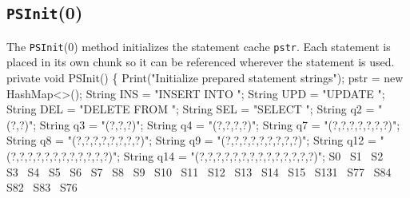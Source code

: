 \documentclass{article}
\theoremstyle{definition}                   %
\begin{document}
\subsection{{\tt{}\protect{}PSInit}(0)}
The {\tt{}\protect{}PSInit}(0) method initializes the statement cache {\tt{}\protect{}pstr}. Each
statement is placed in its own chunk so it can be referenced wherever the
statement is used.
\nwenddocs{}\endmoddef{}
private void PSInit() \{
  Print("Initialize prepared statement strings");
  pstr = new HashMap<>();
  String INS = "INSERT INTO ";
  String UPD = "UPDATE ";
  String DEL = "DELETE FROM ";
  String SEL = "SELECT ";
  String q2  = "(?,?)";
  String q3  = "(?,?,?)";
  String q4  = "(?,?,?,?)";
  String q7  = "(?,?,?,?,?,?,?)";
  String q8  = "(?,?,?,?,?,?,?,?)";
  String q9  = "(?,?,?,?,?,?,?,?,?)";
  String q12 = "(?,?,?,?,?,?,?,?,?,?,?,?)";
  String q14 = "(?,?,?,?,?,?,?,?,?,?,?,?,?,?)";
  \LA{}S0~{\nwtagstyle{}}\RA{}
  \LA{}S1~{\nwtagstyle{}}\RA{}
  \LA{}S2~{\nwtagstyle{}}\RA{}
  \LA{}S3~{\nwtagstyle{}}\RA{}
  \LA{}S4~{\nwtagstyle{}}\RA{}
  \LA{}S5~{\nwtagstyle{}}\RA{}
  \LA{}S6~{\nwtagstyle{}}\RA{}
  \LA{}S7~{\nwtagstyle{}}\RA{}
  \LA{}S8~{\nwtagstyle{}}\RA{}
  \LA{}S9~{\nwtagstyle{}}\RA{}
  \LA{}S10~{\nwtagstyle{}}\RA{}
  \LA{}S11~{\nwtagstyle{}}\RA{}
  \LA{}S12~{\nwtagstyle{}}\RA{}
  \LA{}S13~{\nwtagstyle{}}\RA{}
  \LA{}S14~{\nwtagstyle{}}\RA{}
  \LA{}S15~{\nwtagstyle{}}\RA{}
  \LA{}S131~{\nwtagstyle{}}\RA{}
  \LA{}S77~{\nwtagstyle{}}\RA{}
  \LA{}S84~{\nwtagstyle{}}\RA{}
  \LA{}S82~{\nwtagstyle{}}\RA{}
  \LA{}S83~{\nwtagstyle{}}\RA{}
  \LA{}S76~{\nwtagstyle{}}\RA{}
\end{document}
